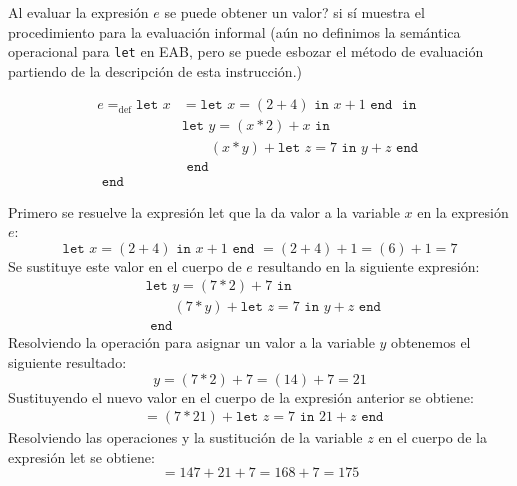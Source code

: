     \begin{exercise}
        Al evaluar la expresión $e$ se puede obtener un valor? si sí muestra el procedimiento para la evaluación informal (aún no definimos la semántica operacional para \texttt{let} en \textsf{EAB}, pero se puede esbozar el método de evaluación partiendo de la descripción de esta instrucción.)
    
        \begin{align*}
        	e=_{\text{def}}\texttt{let  }
        		x&= \texttt{let }x = (2 + 4) \texttt{ in } x+1 \texttt{ end }
        		\texttt{ in }\\
        		 &\texttt{let }y=(x \ast 2)+x 
        		 	\texttt{ in } \\
        		 & \qquad(x\ast y) + \texttt{let }z=7 \texttt{ in } 
        		 						y+z 
        		 				\texttt{ end }\\
        		 &\texttt{ end }\\
        	\texttt{ end }&
        \end{align*}
    
        Primero se resuelve la expresión let que la da valor a la variable $x$ en la expresión $e$:
        \[
            \texttt{let }x = (2 + 4) \texttt{ in } x+1 \texttt{ end } 
             = (2+4) + 1 
             = (6) + 1
             = 7
        \]
        Se sustituye este valor en el cuerpo de $e$ resultando en la siguiente expresión:
        \begin{align*}
           & \texttt{let }y =(7 \ast 2)+7  \texttt{ in } \\
            & \qquad (7\ast y) + \texttt{let }z=7 \texttt{ in } y+z \texttt{ end }\\
            & \texttt{ end }
        \end{align*}
        Resolviendo la operación para asignar un valor a la variable $y$ obtenemos el siguiente resultado: 
        \[
            y = (7 \ast 2) + 7 
            = (14) + 7 
            = 21
        \]
        Sustituyendo el nuevo valor en el cuerpo de la expresión anterior se obtiene:
        \begin{align*}
                 & = (7 \ast 21) + \texttt{let } z=7 \texttt{ in } 21 + z \texttt{ end }
        \end{align*}
        Resolviendo las operaciones y la sustitución de la variable $z$ en el cuerpo de la expresión let se obtiene:
        \[
            = 147 + 21 + 7
            = 168 + 7
            = 175
        \]

    \end{exercise}

